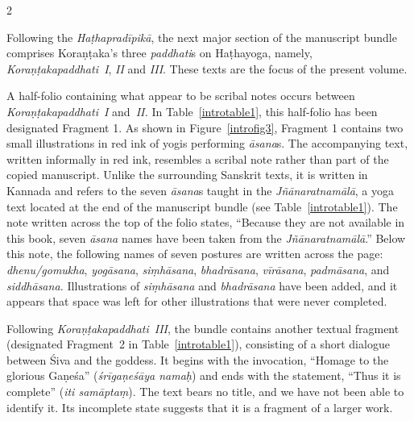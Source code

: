 \begin{nohyp}
\begin{multicols*}{2}
\begin{eng}
Following the \emph{Haṭhapradīpikā}, the next major section of the manuscript bundle comprises Koraṇṭaka's three \emph{paddhati}s on Haṭhayoga, namely, \emph{Koraṇṭakapaddhati~I}, \emph{II} and \emph{III}. These texts are the focus of the present volume.

A half-folio containing what appear to be scribal notes occurs between \emph{Koraṇṭakapaddhati}~\emph{I} and~\emph{II.} In Table~\ref{introtable1}, this half-folio has been designated Fragment 1. As shown in Figure~\ref{introfig3}, Fragment 1 contains two small illustrations in red ink of yogis performing \emph{āsana}s. The accompanying text, written informally in red ink, resembles a scribal note rather than part of the copied manuscript. Unlike the surrounding Sanskrit texts, it is written in Kannada and refers to the seven \emph{āsana}s taught in the \emph{Jñānaratnamālā}, a yoga text located at the end of the manuscript bundle (see Table~\ref{introtable1}). The note written across the top of the folio states, ``Because they are not available in this book, seven \emph{āsana} names have been taken from the \emph{Jñānaratnamālā}.'' Below this note, the following names of seven postures are written across the page: \emph{dhenu/gomukha}, \emph{yogāsana}, \emph{siṃhāsana}, \emph{bhadrāsana}, \emph{vīrāsana}, \emph{padmāsana}, and \emph{siddhāsana.} Illustrations of \emph{siṃhāsana} and \emph{bhadrāsana} have been added, and it appears that space was left for other illustrations that were never completed.




Following \emph{Koraṇṭakapaddhati}~\emph{III}, the bundle contains another textual fragment (designated Fragment~2 in Table~\ref{introtable1}), consisting of a short dialogue between Śiva and the goddess. It begins with the invocation, ``Homage to the glorious Gaṇeśa'' (\emph{śrīgaṇeśāya namaḥ}) and ends with the statement, ``Thus it is complete'' (\emph{iti samāptaṃ}). The text bears no title, and we have not been able to identify it. Its incomplete state suggests that it is a fragment of a larger work.


\end{eng}
\end{multicols*}
\end{nohyp}
